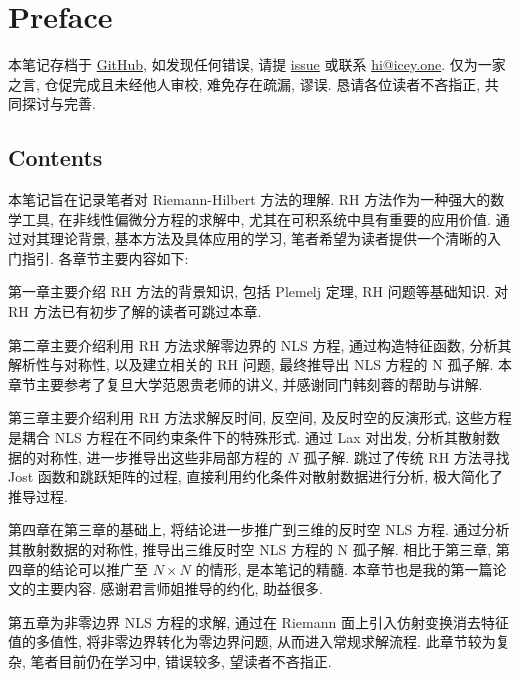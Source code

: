 \chapter{Preface}
本笔记存档于 \href{https://github.com/IceySwan/Notes}{GitHub}, 如发现任何错误, 请提 \href{https://github.com/IceySwan/Notes/issues/new}{issue} 或联系 \href{mailto:hi@icey.one}{hi@icey.one}. 仅为一家之言, 仓促完成且未经他人审校, 难免存在疏漏, 谬误. 恳请各位读者不吝指正, 共同探讨与完善.

\section*{Contents}
本笔记旨在记录笔者对 Riemann-Hilbert 方法的理解. RH 方法作为一种强大的数学工具, 在非线性偏微分方程的求解中, 尤其在可积系统中具有重要的应用价值. 通过对其理论背景, 基本方法及具体应用的学习, 笔者希望为读者提供一个清晰的入门指引. 各章节主要内容如下:

第一章主要介绍 RH 方法的背景知识, 包括 Plemelj 定理, RH 问题等基础知识. 对 RH 方法已有初步了解的读者可跳过本章.

第二章主要介绍利用 RH 方法求解零边界的 NLS 方程, 通过构造特征函数, 分析其解析性与对称性, 以及建立相关的 RH 问题, 最终推导出 NLS 方程的 N 孤子解. 本章节主要参考了复旦大学范恩贵老师的讲义, 并感谢同门韩刻蓉的帮助与讲解.

第三章主要介绍利用 RH 方法求解反时间, 反空间, 及反时空的反演形式, 这些方程是耦合 NLS 方程在不同约束条件下的特殊形式. 通过 Lax 对出发, 分析其散射数据的对称性, 进一步推导出这些非局部方程的 $ N $ 孤子解. 跳过了传统 RH 方法寻找 Jost 函数和跳跃矩阵的过程, 直接利用约化条件对散射数据进行分析, 极大简化了推导过程.

第四章在第三章的基础上, 将结论进一步推广到三维的反时空 NLS 方程. 通过分析其散射数据的对称性, 推导出三维反时空 NLS 方程的 N 孤子解. 相比于第三章, 第四章的结论可以推广至 $N \times N$ 的情形, 是本笔记的精髓. 本章节也是我的第一篇论文的主要内容. 感谢君言师姐推导的约化, 助益很多.

第五章为非零边界 NLS 方程的求解, 通过在 Riemann 面上引入仿射变换消去特征值的多值性, 将非零边界转化为零边界问题, 从而进入常规求解流程. 此章节较为复杂, 笔者目前仍在学习中, 错误较多, 望读者不吝指正.

